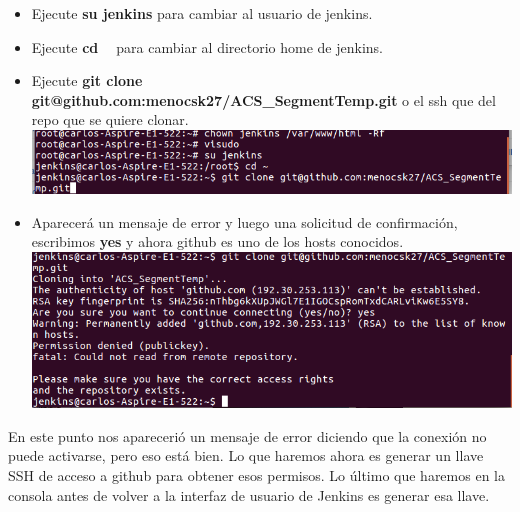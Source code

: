 \documentclass[a4paper]{article}
\begin{document}
{    \begin{itemize}
    \item Ejecute \textbf {su jenkins} para cambiar al usuario de jenkins. 
    \item Ejecute \textbf{cd ~} para cambiar al directorio home de jenkins.   
    \item Ejecute \textbf {git clone git@github.com:menocsk27/ACS\_SegmentTemp.git} o el ssh que del repo que se quiere clonar. \\
    \includegraphics[scale=0.5]{git_clone.png}\\
	\item Aparecerá un mensaje de error y luego una solicitud de confirmación, escribimos \textbf{yes} y ahora github es uno de los hosts conocidos. \\
    \includegraphics[scale=0.5]{permdenied}\\
	\end{itemize}
    
    \newpage En este punto nos aparecerió un mensaje de error diciendo que la conexión no puede activarse, pero eso está bien. Lo que haremos ahora es generar un llave SSH de acceso a github para obtener esos permisos. Lo último que haremos en la consola antes de volver a la interfaz de usuario de Jenkins es generar esa llave. 
    
}
\end{document}
